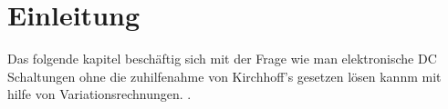 %
%
%
%
\section{Einleitung\label{circuit:section:teil0}}
Das folgende kapitel beschäftig sich mit der Frage wie man elektronische DC Schaltungen ohne die zuhilfenahme von Kirchhoff's gesetzen lösen kannm mit hilfe von Variationsrechnungen.  \cite{circuit:bibtex}.





